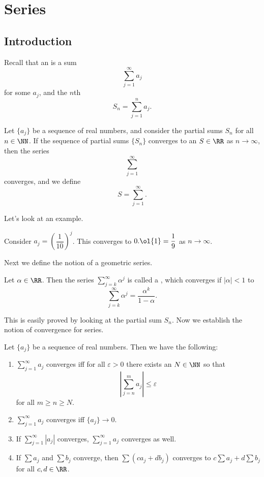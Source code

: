 \chapter{Series}

\section{Introduction}
Recall that an  is a sum 
\[ \sum_{j=1}^\infty a_j \] for some $a_j$, and the $n$th  
\[ S_n = \sum_{j=1}^n a_j. \] 
\begin{definition}
Let $\{a_j\}$ be a sequence of real numbers, and consider the partial sums $S_n$ for all $n \in \NN$. If the sequence of partial sums $\{S_n\}$ converges to an $S \in \RR$ as $n \to \infty$, then the series 
\[ \sum_{j=1}^\infty \] converges, and we define 
\[ S = \sum_{j=1}^\infty. \] 
\end{definition}
Let's look at an example. 
\begin{example}
Consider $a_j = \left (\dfrac{1}{10} \right )^j$. This converges to $0.\ol{1} = \dfrac{1}{9}$ as $n \to \infty$. 
\end{example}

Next we define the notion of a geometric series. 
\begin{definition}
Let $\alpha \in \RR$. Then the series $\sum\limits_{j=k}^\infty \alpha^j$ is called a , which converges if $|\alpha|<1$ to 
\[ \sum_{j=k}^\infty \alpha^j = \dfrac{\alpha^k}{1-\alpha}. \] 
\end{definition}
This is easily proved by looking at the partial sum $S_n$. 
Now we establish the notion of convergence for series. 
\newpage 
\begin{theorem}
	Let $\{a_j\}$ be a sequence of real numbers. Then we have the following: 
	\begin{enumerate}
		\item $\sum\limits_{j=1}^\infty a_j$ converges iff for all $\varepsilon > 0$ there exists an $N \in \NN$ so that 
			\[ \left | \sum_{j=n}^m a_j \right | \leq \varepsilon \] for all $m \geq n \geq N$. 
		\item $\sum\limits_{j=1}^\infty a_j$ converges iff $\{a_j\} \to 0$. 
		\item If $\sum\limits_{j=1}^\infty |a_j|$ converges, $\sum\limits_{j=1}^\infty a_j$ converges as well. 
		\item If $\sum a_j$ and $\sum b_j$ converge, then $\sum (ca_j + db_j)$ converges to $c\sum a_j + d\sum b_j$ for all $c, d \in \RR$. 
	\end{enumerate}
\end{theorem}

